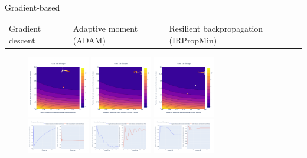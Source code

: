 \documentclass[aspectratio=169]{beamer} %
\begin{document}
\begin{frame}{Gradient-based}
    \vspace{-6mm}
    \begin{table}[]
        \centering
        \footnotesize
    \begin{tabularx}{0.86\textwidth}{*{3}{Y}}
         Gradient descent &
         Adaptive moment (ADAM) &
         Resilient backpropagation (IRPropMin)
    \end{tabularx}
    \end{table}

    \vspace{-6mm}
    \begin{figure}
        \centering
        \includegraphics[width=0.24\textwidth]{Images/Optimisers/graddesc_cost.png}
        \includegraphics[width=0.24\textwidth]{Images/Optimisers/adam_cost.png}
        \includegraphics[width=0.24\textwidth]{Images/Optimisers/irpropmin_cost.png} ~~~\\
        \includegraphics[width=0.24\textwidth]{Images/Optimisers/graddesc_params.png}
        \includegraphics[width=0.24\textwidth]{Images/Optimisers/adam_params.png}
        \includegraphics[width=0.24\textwidth]{Images/Optimisers/irpropmin_params.png}
        \label{fig:optimisers1}
    \end{figure}
\end{frame}
\end{document}
